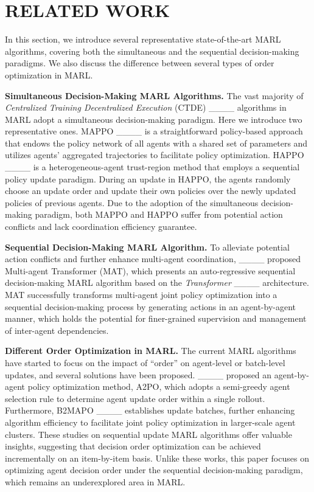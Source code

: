 \section{RELATED WORK}
\label{sec:related work}
In this section, we introduce several representative state-of-the-art MARL algorithms, covering both the simultaneous and the sequential decision-making paradigms. 
We also discuss the difference between several types of order optimization in MARL.

\noindent \textbf{Simultaneous Decision-Making MARL Algorithms.} The vast majority of \textit{Centralized Training Decentralized Execution} (CTDE) ____ algorithms in MARL adopt a simultaneous decision-making paradigm. 
Here we introduce two representative ones.
MAPPO ____ is a straightforward policy-based approach that endows the policy network of all agents with a shared set of parameters and utilizes agents' aggregated trajectories to facilitate policy optimization. 
HAPPO ____ is a heterogeneous-agent trust-region method that employs a sequential policy update paradigm. 
During an update in HAPPO, the agents randomly choose an update order and update their own policies over the newly updated policies of previous agents. 
Due to the adoption of the simultaneous decision-making paradigm, both MAPPO and HAPPO suffer from potential action conflicts and lack coordination efficiency guarantee.

\noindent \textbf{Sequential Decision-Making MARL Algorithm.}
To alleviate potential action conflicts and further enhance multi-agent coordination, ____ proposed Multi-agent Transformer (MAT), which presents an auto-regressive sequential decision-making MARL algorithm based on the \textit{Transformer} ____ architecture. MAT successfully transforms multi-agent joint policy optimization into a sequential decision-making process by generating actions in an agent-by-agent manner, which holds the potential for finer-grained supervision and management of inter-agent dependencies.

\noindent \textbf{Different Order Optimization in MARL.}
The current MARL algorithms have started to focus on the impact of ``order'' on agent-level or batch-level updates, and several solutions have been proposed.
____ proposed an agent-by-agent policy optimization method, A2PO, which adopts a semi-greedy agent selection rule to determine agent update order within a single rollout. 
Furthermore, B2MAPO ____ establishes update batches, further enhancing algorithm efficiency to facilitate joint policy optimization in larger-scale agent clusters. 
These studies on sequential update MARL algorithms offer valuable insights, suggesting that decision order optimization can be achieved incrementally on an item-by-item basis.
Unlike these works, this paper focuses on optimizing agent decision order under the sequential decision-making paradigm, which remains an underexplored area in MARL.


